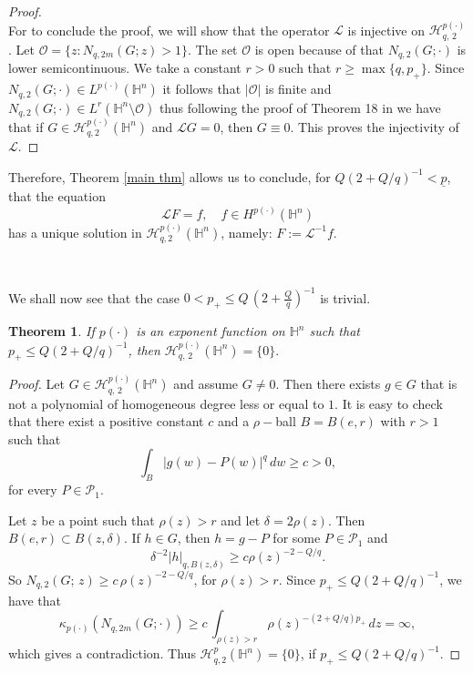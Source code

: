 \documentclass[oneside,10pt]{article}
\newtheorem{theorem}{Theorem}
\begin{document}
\begin{proof}
\[\]
For to conclude the proof, we will show that the operator $\mathcal{L}$ is injective on $\mathcal{H}^{p(\cdot)}_{q, \, 2}$. Let 
$\mathcal{O} = \{ z : N_{q, 2m}(G; z) > 1\}$. The set $\mathcal{O}$ is open because of that $N_{q, 2}(G; \cdot)$ is lower semicontinuous.
We take a constant $r>0$  such that $r \geq \max\{q, p_{+}\}$. Since $N_{q, 2}(G; \cdot) \in L^{p(\cdot)}(\mathbb{H}^{n})$ it follows that 
$|\mathcal{O}|$ is finite and $N_{q, 2}(G; \cdot) \in L^{r}(\mathbb{H}^{n} \setminus \mathcal{O})$ thus following the proof of Theorem 18 in \cite{rocha5} we have that if $G \in \mathcal{H}^{p(\cdot)}_{q, 2}(\mathbb{H}^{n})$ and $\mathcal{L} G = 0$, then $G \equiv 0$. This proves the injectivity of $\mathcal{L}$. 
\end{proof}

Therefore, Theorem \ref{main thm} allows us to conclude, for $Q(2+Q/q)^{-1} < \underline{p}$, that the equation
\[ 
\mathcal{L} F = f, \,\,\,\,\,\, f \in H^{p(\cdot)}(\mathbb{H}^n) 
\]
has a unique solution in $\mathcal{H}^{p(\cdot)}_{q, 2}(\mathbb{H}^{n})$, namely: $F := \mathcal{L}^{-1}f$.

\

We shall now see that the case $0 < p_{+} \leq Q \, (2 + \frac{Q}{q})^{-1}$ is trivial.

\begin{theorem} \label{second thm}
If $p(\cdot)$ is an exponent function on $\mathbb{H}^n$ such that $p_{+} \leq Q (2 + Q/q)^{-1}$, then 
$\mathcal{H}^{p(\cdot)}_{q, \, 2}(\mathbb{H}^{n}) = \{ 0 \}.$
\end{theorem}

\begin{proof} Let $G \in \mathcal{H}^{p(\cdot)}_{q, \, 2}(\mathbb{H}^{n})$ and assume $G \neq 0$. Then there exists 
$g \in G$ that is not a polynomial of homogeneous degree less or equal to $1$. It is easy to check that there exist a positive constant $c$ and a $\rho-$ball $B = B(e,r)$ with $r>1$ such that
\[
\int_{B} |g(w) - P(w)|^{q} \, dw \geq c > 0,
\]
for every $P \in \mathcal{P}_{1}$.

Let $z$ be a point such that $\rho(z) > r$ and let $\delta = 2 \rho(z)$. Then $B(e, r) \subset B(z, \delta)$. If $h \in G$, then 
$h = g - P$ for some $P \in \mathcal{P}_{1}$ and
\[
\delta^{-2}|h|_{q, B(z, \delta)} \geq c \rho(z)^{-2-Q/q}.
\]
So $N_{q,2}(G; \, z) \geq c \, \rho(z)^{-2-Q/q}$, for $\rho(z) > r$. Since $p_{+} \leq Q(2+Q/q)^{-1}$, we have that
\[
\kappa_{p(\cdot)} \left( N_{q,2m}(G; \cdot) \right) \geq c \, \int_{\rho(z) > r} \rho(z)^{-(2+Q/q)p_{+}} \, dz = \infty,
\]
which gives a contradiction. Thus $\mathcal{H}^{p}_{q, 2}(\mathbb{H}^{n}) = \{0\}$, if $p_{+} \leq Q(2+Q/q)^{-1}$.
\end{proof}
\end{document}

